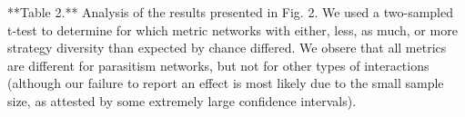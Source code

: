 **Table 2.** Analysis of the results presented in Fig. 2. We used a two-sampled
t-test to determine for which metric networks with either, less, as much,
or more strategy diversity than expected by chance differed. We obsere
that all metrics are different for parasitism networks, but not for other
types of interactions (although our failure to report an effect is most
likely due to the small sample size, as attested by some extremely large
confidence intervals).
